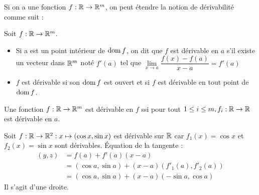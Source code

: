      Si on a une fonction $f:\mathbb{R}\to\mathbb{R}^m$, on peut étendre la notion de dérivabilité comme suit :
     \begin{definition}
         Soit $f:\mathbb{R}\to\mathbb{R}^m$.
         \begin{itemize}
             \item Si a est un point intérieur de $\operatorname{dom} f$, on dit que $f$ est dérivable en $a$ s'il existe un vecteur dans $\mathbb{R}^m$ noté $f'(a)$ tel que $\lim\limits_{x\to a}\dfrac{f(x)-f(a)}{x-a} = f'(a)$
             \item $f$ est dérivable si son $\operatorname{dom} f$ est ouvert et si $f$ est dérivable en tout point de $\operatorname{dom} f$.
         \end{itemize}
     \end{definition}
     \begin{remarque}
         Une fonction $f:\mathbb{R}\to\mathbb{R}^m$ est dérivable en $f$ ssi pour tout $1\leq i\leq m, f_i:\mathbb{R}\to\mathbb{R}$ est dérivable en $a$.
     \end{remarque}
     \begin{exemple}
         Soit $f:\mathbb{R}\to\mathbb{R}^2: x\mapsto (\cos x, \sin x)$ est dérivable sur $\mathbb{R}$ car $f_1(x) = \cos x$ et $f_2(x) = \sin x$ sont dérivables.
         Équation de la tangente : \begin{align}
             (y,z) &= f(a) + f'(a)(x-a)\\
             &= (\cos a,\sin a) + (x-a)(f'_1(a),f'_2(a))\\
             &= (\cos a,\sin a) + (x-a)(-\sin a, \cos a)
         \end{align} 
         Il s'agit d'une droite.
     \end{exemple}
